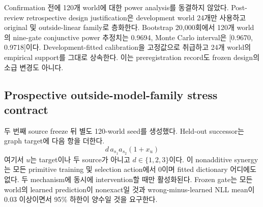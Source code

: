 Confirmation 전에 120개 world에 대한 power analysis를 동결하지 않았다. Post-review
retrospective design justification은 development world 24개만 사용하고 original 및
outside-linear family로 층화한다. Bootstrap 20,000회에서 120개 world의 nine-gate
conjunctive power 추정치는 0.9694, Monte Carlo interval은 [0.9670, 0.9718]이다.
Development-fitted calibration을 고정값으로 취급하고 24개 world의 empirical
support를 그대로 상속한다. 이는 preregistration record도 frozen design의 소급
변경도 아니다.

\subsection{Prospective outside-model-family stress contract}

두 번째 source freeze 뒤 별도 120-world seed를 생성했다. Held-out successor는 graph
target에 다음 항을 더한다.
\[
d\,a_{s_1}a_{s_2}(1+x_u)
\]
여기서 \(u\)는 target이나 두 source가 아니고 \(d\in\{1,2,3\}\)이다. 이 nonadditive
synergy는 모든 primitive training 및 selection action에서 0이며 fitted dictionary
어디에도 없다. 두 mechanism에 동시에 intervention할 때만 활성화된다. Frozen
gate는 모든 world의 learned prediction이 nonexact일 것과 wrong-minus-learned NLL
mean이 0.03 이상이면서 95\% 하한이 양수일 것을 요구한다.
